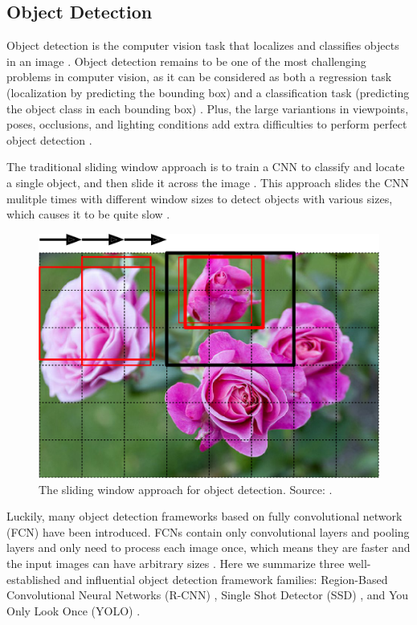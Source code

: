 \documentclass[a4paper, 11pt, oneside]{article}
\begin{document}
  \subsection{Object Detection}

  \label{sec:objectdetection}

  Object detection is the computer vision task that localizes and classifies objects in an image
  \cite{elgendy2020deep, zhao2019object, liu2020deep, geron2019hands}. Object detection remains to be one of the most
  challenging problems in computer vision, as it can be considered as both a regression task (localization by predicting
  the bounding box) and a classification task (predicting the object class in each bounding box)
  \cite{elgendy2020deep, girshick2014rich, geron2019hands}. Plus, the large variantions in viewpoints, poses, occlusions,
  and lighting conditions add extra difficulties to perform perfect object detection \cite{zhao2019object, liu2020deep}.

  The traditional sliding window approach is to train a CNN to classify and locate a single object, and then slide it
  across the image \cite{geron2019hands, pasquet2017amphora, girshick2014rich, redmon2016you}. This approach slides the
  CNN mulitple times with different window sizes to detect objects with various sizes, which causes it to be quite slow
  \cite{geron2019hands}.

  \begin{figure}[ht]
    \begin{center}
      \includegraphics[width=.5\textwidth]{sliding_window.png}
    \end{center}
    \caption{The sliding window approach for object detection. Source: \cite{o2019deep}.}
  \end{figure}

  Luckily, many object detection frameworks based on fully convolutional network (FCN) \cite{long2015fully} have been
  introduced. FCNs contain only convolutional layers and pooling layers and only need to process each image once, which
  means they are faster and the input images can have arbitrary sizes \cite{elgendy2020deep, geron2019hands, long2015fully}.
  Here we summarize three well-established and influential object detection framework families: Region-Based Convolutional
  Neural Networks (R-CNN) \cite{girshick2014rich, girshick2015fast, ren2015faster}, Single Shot Detector (SSD)
  \cite{liu2016ssd}, and You Only Look Once (YOLO)
  \cite{redmon2016you, redmon2017yolo9000, redmon2018yolov3, bochkovskiy2020yolov4, yolov5}.
\end{document}
